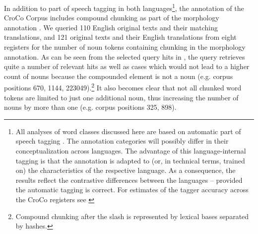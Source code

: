 \documentclass[output=paper]{LSP/langsci}
\begin{document}
In addition to part of speech tagging in both languages\footnote{All analyses of word classes discussed here are based on automatic part of speech tagging \citep{HansenSchirra2012Corpus}. The annotation categories will possibly differ in their conceptualization across languages. The advantage of this language-internal tagging is that the annotation is adapted to (or, in technical terms, trained on) the characteristics of the respective language. As a consequence, the results reflect the contrastive differences between the languages -- provided the automatic tagging is correct. For estimates of the tagger accuracy across the CroCo registers see \citet[50-52]{HansenSchirra2012Corpus}}, the annotation of the CroCo Corpus includes compound chunking as part of the morphology annotation \citep{HansenSchirra2012Corpus}. We queried 110 English original texts and their matching  translations, and 121  original texts and their English translations from eight registers for the number of noun tokens containing chunking in the morphology annotation. As can be seen from the selected query hits in , the query retrieves quite a number of relevant hits as well as cases which would not lead to a higher count of nouns because the compounded element is not a noun (e.g. corpus positions 670, 1144, 223049).\footnote{Compound chunking after the slash is represented by lexical bases separated by hashes.} It also becomes clear that not all chunked word tokens are limited to just one additional noun, thus increasing the number of nouns by more than one (e.g. corpus positions 325, 898). 
\end{document}
